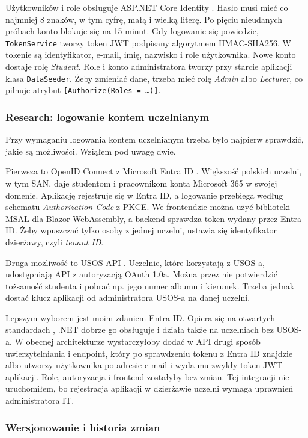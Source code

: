 \documentclass[times]{san}
\begin{document}
Użytkowników i role obsługuje ASP.NET Core Identity \cite{ms_identity}. Hasło musi mieć co najmniej 8 znaków, w tym cyfrę, małą i wielką literę. Po pięciu nieudanych próbach konto blokuje się na 15 minut. Gdy logowanie się powiedzie, \texttt{TokenService} tworzy token JWT podpisany algorytmem HMAC-SHA256. W tokenie są identyfikator, e-mail, imię, nazwisko i role użytkownika. Nowe konto dostaje rolę \textit{Student}. Role i konto administratora tworzy przy starcie aplikacji klasa \texttt{DataSeeder}. Żeby zmieniać dane, trzeba mieć rolę \textit{Admin} albo \textit{Lecturer}, co pilnuje atrybut \texttt{[Authorize(Roles = \ldots)]}.

\subsubsection{Research: logowanie kontem uczelnianym}
\label{sec:research}

Przy wymaganiu logowania kontem uczelnianym trzeba było najpierw sprawdzić, jakie są możliwości. Wziąłem pod uwagę dwie.

Pierwsza to OpenID Connect z Microsoft Entra ID \cite{oidc,ms_entra}. Większość polskich uczelni, w tym SAN, daje studentom i pracownikom konta Microsoft 365 w swojej domenie. Aplikację rejestruje się w Entra ID, a logowanie przebiega według schematu \textit{Authorization Code} z PKCE. We frontendzie można użyć biblioteki MSAL dla Blazor WebAssembly, a backend sprawdza token wydany przez Entra ID. Żeby wpuszczać tylko osoby z jednej uczelni, ustawia się identyfikator dzierżawy, czyli \textit{tenant ID}.

Druga możliwość to USOS API \cite{usos_api}. Uczelnie, które korzystają z USOS-a, udostępniają API z autoryzacją OAuth 1.0a. Można przez nie potwierdzić tożsamość studenta i pobrać np. jego numer albumu i kierunek. Trzeba jednak dostać klucz aplikacji od administratora USOS-a na danej uczelni.

Lepszym wyborem jest moim zdaniem Entra ID. Opiera się na otwartych standardach \cite{rfc6749,oidc}, .NET dobrze go obsługuje i działa także na uczelniach bez USOS-a. W obecnej architekturze wystarczyłoby dodać w API drugi sposób uwierzytelniania i endpoint, który po sprawdzeniu tokenu z Entra ID znajdzie albo utworzy użytkownika po adresie e-mail i wyda mu zwykły token JWT aplikacji. Role, autoryzacja i frontend zostałyby bez zmian. Tej integracji nie uruchomiłem, bo rejestracja aplikacji w dzierżawie uczelni wymaga uprawnień administratora IT.

\subsubsection{Wersjonowanie i historia zmian}
\end{document}
